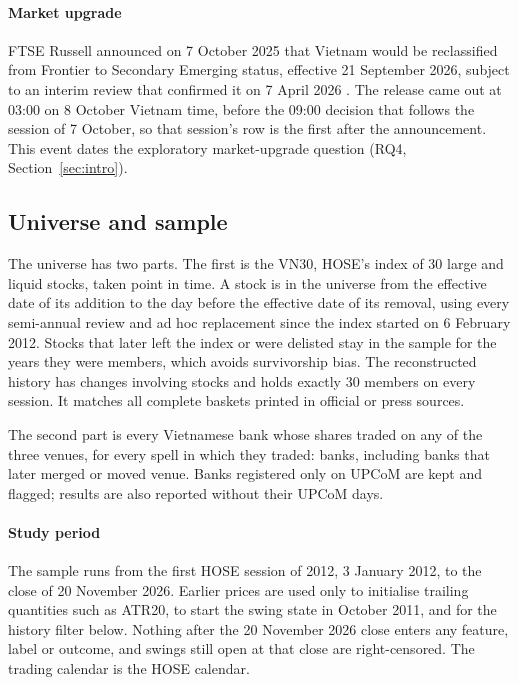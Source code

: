 \paragraph{Market upgrade} FTSE Russell announced on 7 October 2025 that Vietnam would be
reclassified from Frontier to Secondary Emerging status, effective 21 September 2026, subject to an
interim review that confirmed it on 7 April 2026 \citep{FTSE2025,FTSE2026}. The release came out at 03:00 on 8
October Vietnam time, before the 09:00 decision that follows the session of 7 October, so that
session's row is the first after the announcement. This event dates the exploratory market-upgrade question (RQ4, Section~\ref{sec:intro}).

\subsection{Universe and sample}\label{sec:universe}

The universe has two parts. The first is the VN30, HOSE's index of 30 large and liquid stocks, taken
point in time. A stock is in the universe from the effective date of its addition to the day before
the effective date of its removal, using every semi-annual review and ad hoc replacement since the
index started on 6 February 2012. Stocks that later left the index or were delisted stay in the
sample for the years they were members, which avoids survivorship bias. The reconstructed history
has  changes involving  stocks and holds exactly 30 members
on every session. It matches all  complete baskets printed in official or press
sources.

The second part is every Vietnamese bank whose shares traded on any of the three venues, for every
spell in which they traded:  banks, including banks that later merged or moved
venue. Banks registered only on UPCoM are kept and flagged; results are also reported without their
UPCoM days.

\paragraph{Study period} The sample runs from the first HOSE session of 2012, 3 January 2012, to the
close of 20 November 2026. Earlier prices are used only to initialise trailing quantities such as ATR20,
to start the swing state in October 2011, and for the history filter below. Nothing after the 20 November 2026 close enters any feature,
label or outcome, and swings still open at that close are right-censored. The trading calendar is
the HOSE calendar.

